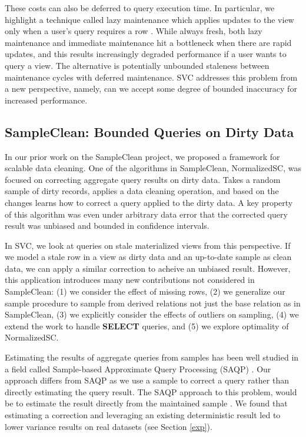 These costs can also be deferred to query execution time.
In particular, we highlight a technique called lazy maintenance which applies updates to the view only when a user's query requires a row \cite{zhou2007lazy}.
While always fresh, both lazy maintenance and immediate maintenance hit a bottleneck when there are rapid updates, and this results increasingly degraded performance if a user wants to query a view.
The alternative is potentially unbounded staleness between maintenance cycles with deferred maintenance.
SVC addresses this problem from a new perspective, namely, can we accept some degree of bounded inaccuracy for increased performance.

\subsection{SampleClean: Bounded Queries on Dirty Data}
In our prior work on the SampleClean project, we proposed a framework for scalable data cleaning.
One of the algorithms in SampleClean, NormalizedSC, was focused on correcting aggregate query results on dirty data.
Takes a random sample of dirty records, applies a data cleaning operation, and based on the changes learns how to correct a query applied to the dirty data.
A key property of this algorithm was even under arbitrary data error that the corrected query result was unbiased and bounded in confidence intervals.

In SVC, we look at queries on stale materialized views from this perspective.
If we model a stale row in a view as dirty data and an up-to-date sample as clean data, we can apply a similar correction to acheive an unbiased result.
However, this application introduces many new contributions not considered in SampleClean: (1) we consider the effect of missing rows, (2) we generalize our sample procedure to sample from derived relations not just the base relation as in SampleClean, (3) we explicitly consider the effects of outliers on sampling, (4) we extend the work to handle \textbf{SELECT} queries, and (5) we explore optimality of NormalizedSC.

Estimating the results of aggregate queries from samples has been
well studied in a field called Sample-based Approximate Query Processing
(SAQP) \cite{OlkenR86,AgarwalMPMMS13}.
Our approach differs from SAQP as we use a sample to correct a query rather than directly estimating the query result.
The SAQP approach to this problem, would be to
estimate the result directly from the maintained sample \cite{joshi2008materialized}.
We found that estimating
a correction and leveraging an existing deterministic result led
to lower variance results on real datasets (see Section \ref{exp}). 



